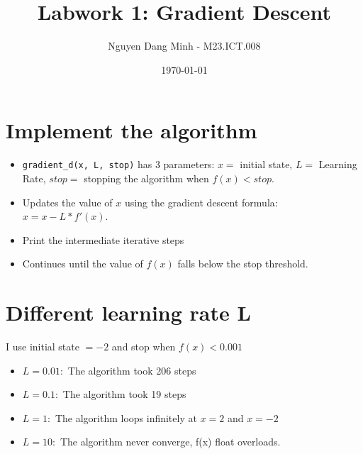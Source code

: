 \documentclass{article}
\title{Labwork 1: Gradient Descent}
\author{Nguyen Dang Minh - M23.ICT.008}
\date{\today}
\begin{document}
\maketitle


\section{Implement the algorithm}
\begin{itemize}
\item \texttt{gradient\_d(x, L, stop)} has 3 parameters: $x = $ initial state, $L =$ Learning Rate, $stop =$ stopping the algorithm when $f(x)<stop$. 


\item Updates the value of $x$ using the gradient descent formula: $x = x - L * f'(x)$.


\item Print the intermediate iterative steps


\item Continues until the value of $f(x)$ falls below the stop threshold.
\end{itemize}
\section{Different learning rate L}
I use initial state $= -2$ and stop when $f(x) < 0.001$

\begin{itemize}
    \item \textbf{$L = 0.01:$} The algorithm took 206 steps
    \item \textbf{$L = 0.1:$} The algorithm took 19 steps    
    \item \textbf{$L = 1:$} The algorithm loops infinitely at $x=2$ and $x=-2$
    \item \textbf{$L = 10:$} The algorithm never converge, f(x) float overloads.
\end{itemize}
\end{document}
